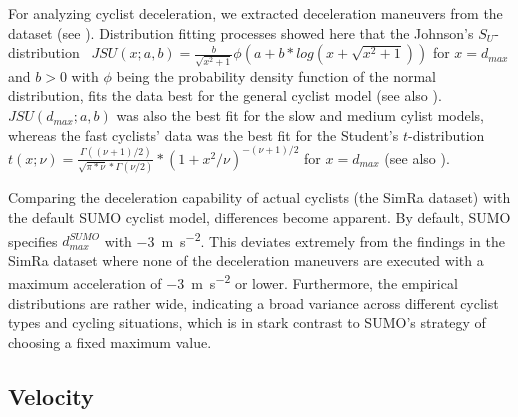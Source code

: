 For analyzing cyclist deceleration, we extracted deceleration maneuvers from the dataset (see ).
Distribution fitting processes showed here that the Johnson's $S_{U}$-distribution~\cite{johnson1949systems} $JSU(x; a,b) = \frac{b}{\sqrt{x^2+1}}\phi(a+b*log(x+\sqrt{x^2+1}))$ for $x=d_{max}$ and $b>0$ with $\phi$ being the probability density function of the normal distribution, fits the data best for the general cyclist model (see also ).
$JSU(d_{max}; a,b)$ was also the best fit for the slow and medium cylist models, whereas the fast cyclists' data was the best fit for the Student's $t$-distribution~\cite{student1908probable} $t(x; \nu)=\frac{\Gamma((\nu+1)/2)}{\sqrt{\pi*\nu}*\Gamma(\nu/2)}*(1+x^2/\nu)^{-(\nu+1)/2}$ for $x=d_{max}$ (see also ).

Comparing the deceleration capability of actual cyclists (the SimRa dataset) with the default SUMO cyclist model, differences become apparent.
By default, SUMO specifies $d_{max}^{SUMO}$ with \SI{-3}{\metre\per\square\second}.
This deviates extremely from the findings in the SimRa dataset where none of the deceleration maneuvers are executed with a maximum acceleration of \SI{-3}{\metre\per\square\second} or lower.
Furthermore, the empirical distributions are rather wide, indicating a broad variance across different cyclist types and cycling situations, which is in stark contrast to SUMO's strategy of choosing a fixed maximum value.

\subsection{Velocity}
\label{subsec:velocity_preprocessing}

